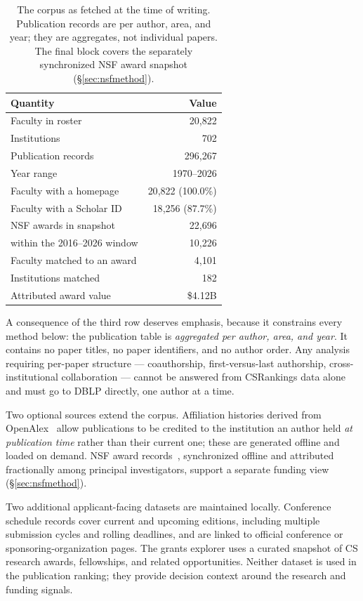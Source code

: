 \documentclass[11pt]{article}
\newcommand{\csr}{CSRankings}
\begin{document}
\begin{table}[t]
\centering
\caption{The corpus as fetched at the time of writing. Publication records are
per author, area, and year; they are aggregates, not individual papers. The
final block covers the separately synchronized NSF award snapshot
(\S\ref{sec:nsfmethod}).}
\label{tab:dataset}
\begin{tabular}{lr}
\toprule
Quantity & Value \\
\midrule
Faculty in roster            & 20{,}822 \\
Institutions                 & 702 \\
Publication records          & 296{,}267 \\
Year range                   & 1970--2026 \\
Faculty with a homepage      & 20{,}822 (100.0\%) \\
Faculty with a Scholar ID    & 18{,}256 (87.7\%) \\
\midrule
NSF awards in snapshot       & 22{,}696 \\
\quad within the 2016--2026 window   & 10{,}226 \\
Faculty matched to an award  & 4{,}101 \\
Institutions matched         & 182 \\
Attributed award value       & \$4.12B \\
\bottomrule
\end{tabular}
\end{table}

A consequence of the third row deserves emphasis, because it constrains every
method below: the publication table is \emph{aggregated per author, area, and
year}. It contains no paper titles, no paper identifiers, and no author order.
Any analysis requiring per-paper structure --- coauthorship, first-versus-last
authorship, cross-institutional collaboration --- cannot be answered from
\csr{} data alone and must go to DBLP directly, one author at a time.

Two optional sources extend the corpus. Affiliation histories derived from
OpenAlex~\cite{openalex} allow publications to be credited to the institution
an author held \emph{at publication time} rather than their current one; these
are generated offline and loaded on demand. NSF award
records~\cite{nsfawards}, synchronized offline and attributed fractionally
among principal investigators, support a separate funding view
(\S\ref{sec:nsfmethod}).

Two additional applicant-facing datasets are maintained locally. Conference
schedule records cover current and upcoming editions, including multiple
submission cycles and rolling deadlines, and are linked to official conference
or sponsoring-organization pages. The grants explorer uses a curated snapshot
of CS research awards, fellowships, and related opportunities. Neither dataset
is used in the publication ranking; they provide decision context around the
research and funding signals.
\end{document}
